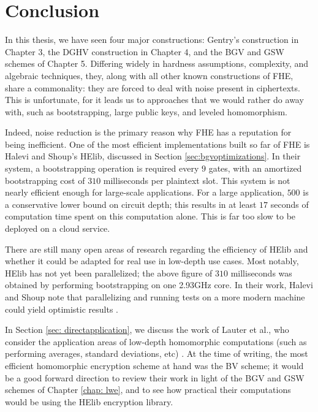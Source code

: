 \chapter*{Conclusion}



    In this thesis, we have seen four major constructions: Gentry's construction in Chapter 3, the DGHV construction in Chapter 4, and the BGV and GSW schemes of Chapter 5. Differing widely in hardness assumptions, complexity, and algebraic techniques, they, along with all other known constructions of FHE, share a commonality: they are forced to deal with noise present in ciphertexts. This is unfortunate, for it leads us to approaches that we would rather do away with, such as bootstrapping, large public keys, and leveled homomorphism.

    Indeed, noise reduction is the primary reason why FHE has a reputation for being inefficient. One of the most efficient implementations built so far of FHE is Halevi and Shoup's HElib, discussed in Section \ref{sec:bgvoptimizations}. In their system, a bootstrapping operation is required every $9$ gates, with an amortized bootstrapping cost of $310$ milliseconds per plaintext slot. This system is not nearly efficient enough for large-scale applications. For a large application, $500$ is a conservative lower bound on circuit depth; this results in at least $17$ seconds of computation time spent on this computation alone. This is far too slow to be deployed on a cloud service.

    There are still many open areas of research regarding the efficiency of HElib and whether it could be adapted for real use in low-depth use cases. Most notably, HElib has not yet been parallelized; the above figure of $310$ milliseconds was obtained by performing bootstrapping on one 2.93GHz core. In their work, Halevi and Shoup note that parallelizing and running tests on a more modern machine could yield optimistic results \cite{Halevi2015}.

    In Section \ref{sec: directapplication}, we discuss the work of Lauter et al., who consider the application areas of low-depth homomorphic computations (such as performing averages, standard deviations, etc) \cite{bvpractical}. At the time of writing, the most efficient homomorphic encryption scheme at hand was the BV scheme; it would be a good forward direction to review their work in light of the BGV and GSW schemes of Chapter \ref{chap: lwe}, and to see how practical their computations would be using the HElib encryption library.

